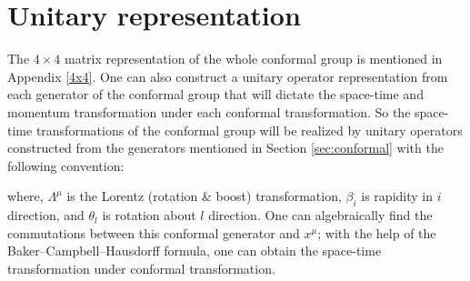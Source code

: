 \documentclass[aps,reprint,notitlepage,nofootinbib,superscriptaddress]{revtex4-1}
\begin{document}
\section{Unitary representation}
\label{unitary}
The $4\times4$ matrix representation of the whole conformal group is mentioned in Appendix \ref{4x4}. One can also construct a unitary operator representation from each generator of the conformal group that will dictate the space-time and momentum transformation under each conformal transformation. So the space-time transformations of the conformal group  will be realized by unitary operators constructed from the generators mentioned in Section \ref{sec:conformal} with the following convention:
\begin{table}[h!]
    \centering
    \label{tab:my_label}
\end{table}

where, $\Lambda^\mu$ is the Lorentz (rotation \& boost) transformation, $\beta_i$ is rapidity in $i$ direction, and $\theta_l$ is rotation about $l$ direction. One can algebraically find the commutations between this conformal generator and $x^\mu$; with the help of the Baker–Campbell–Hausdorff formula, one can obtain the space-time transformation under conformal transformation.
\end{document}
